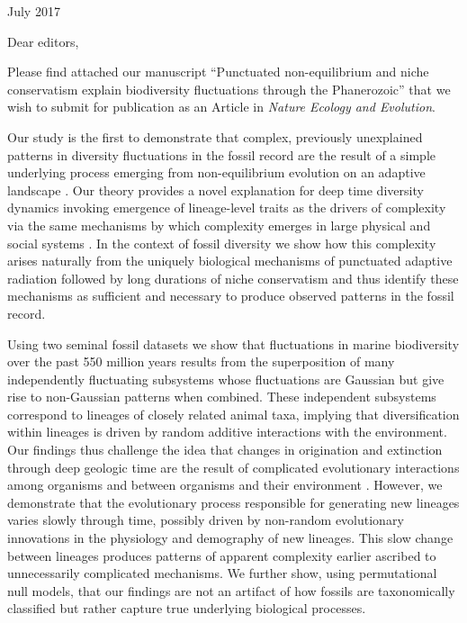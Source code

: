 \documentclass[12pt]{article}
\let\citep=\autocite
\begin{document}
 July 2017

\vspace{2em}

\noindent
Dear editors,
\vspace{2em}

Please find attached our manuscript ``Punctuated non-equilibrium and
niche conservatism explain biodiversity fluctuations through the
Phanerozoic'' that we wish to submit for publication as an Article in
{\it Nature Ecology and Evolution}.

Our study is the first to demonstrate that complex, previously
unexplained patterns in diversity fluctuations in the fossil record
are the result of a simple underlying process emerging from
non-equilibrium evolution on an adaptive landscape
\citep{eldredgeGould1972, newman1985adaptive}. Our theory provides a
novel explanation for deep time diversity dynamics invoking emergence
of lineage-level traits as the drivers of complexity via the same
mechanisms by which complexity emerges in large physical
\citep{beck2004} and social systems \citep{fuentes2009}. In the
context of fossil diversity we show how this complexity arises
naturally from the uniquely biological mechanisms of punctuated
adaptive radiation \citep{eldredgeGould1972, newman1985adaptive,
  hopkins2014} followed by long durations of niche conservatism
\citep{ackerly2003, roy2009range, hopkins2014} and thus identify these
mechanisms as sufficient and necessary to produce observed patterns in
the fossil record.

Using two seminal fossil datasets \citep{sepkoski1992, alroy08} we show
that fluctuations in marine biodiversity over the past 550 million
years results from the superposition of many independently fluctuating
subsystems whose fluctuations are Gaussian but give rise to
non-Gaussian patterns when combined.  These independent subsystems
correspond to lineages of closely related animal taxa, implying that
diversification within lineages is driven by random additive
interactions with the environment. Our findings thus challenge the
idea that changes in origination and extinction through deep geologic
time are the result of complicated evolutionary interactions among
organisms and between organisms and their environment \citep{bak1993,
  sole1997, newman1995}. However, we demonstrate that the evolutionary
process responsible for generating new lineages varies slowly through
time, possibly driven by non-random evolutionary innovations in the
physiology and demography of new lineages. This slow change between
lineages produces patterns of apparent complexity earlier ascribed to
unnecessarily complicated mechanisms. We further show, using
permutational null models, that our findings are not an artifact of how
fossils are taxonomically classified but rather capture true
underlying biological processes.
\end{document}
